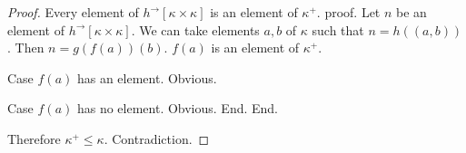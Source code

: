 \documentclass{article}
\newcommand{\Prod}[2]{#1\times #2}
\newcommand{\Succ}[1]{#1^{+}}
\newcommand{\image}[2]{#1^{\to}[#2]}
\begin{document}
\begin{forthel}
\begin{proof}
        Every element of $\image{h}{\Prod{\kappa}{\kappa}}$ is an element of $\Succ{\kappa}$.
        proof.
          Let $n$ be an element of $\image{h}{\Prod{\kappa}{\kappa}}$.
          We can take elements $a,b$ of $\kappa$ such that $n = h((a,b))$.
          Then $n = g(f(a))(b)$. $f(a)$ is an element of $\Succ{\kappa}$.

          Case $f(a)$ has an element. Obvious.

          Case $f(a)$ has no element. Obvious.
        End.
      End.

      Therefore $\Succ{\kappa} \leq \kappa$. Contradiction.
    \end{proof}
  \end{forthel}
\end{document}
